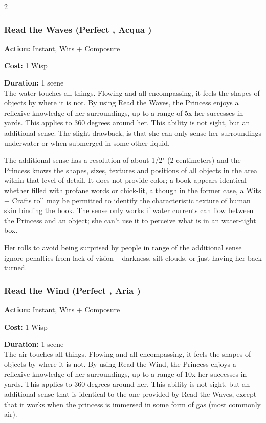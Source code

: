 \begin{multicols}{2}
\subsubsection*{Read the Waves (Perfect \textbullet, Acqua \textbullet)}

\noindent \textbf{Action:} Instant, Wits + Composure

\noindent \textbf{Cost:} 1 Wisp

\noindent \textbf{Duration:} 1 scene \\

\noindent The water touches all things. Flowing and all-encompassing, it feels the shapes of objects by where it is not. By using Read the Waves, the Princess enjoys a reflexive knowledge of her surroundings, up to a range of 5x her successes in yards. This applies to 360 degrees around her. This ability is not sight, but an additional sense. The slight drawback, is that she can only sense her surroundings underwater or when submerged in some other liquid. 

The additional sense has a resolution of about 1/2" (2 centimeters) and the Princess knows the shapes, sizes, textures and positions of all objects in the area within that level of detail. It does not provide color; a book appears identical whether filled with profane words or chick-lit, although in the former case, a Wits + Crafts roll may be permitted to identify the characteristic texture of human skin binding the book. The sense only works if water currents can flow between the Princess and an object; she can't use it to perceive what is in an water-tight box. 

Her rolls to avoid being surprised by people in range of the additional sense ignore penalties from lack of vision -- darkness, silt clouds, or just having her back turned.

\subsubsection*{Read the Wind (Perfect \textbullet, Aria \textbullet)}

\noindent \textbf{Action:} Instant, Wits + Composure

\noindent \textbf{Cost:} 1 Wisp

\noindent \textbf{Duration:} 1 scene \\

\noindent The air touches all things. Flowing and all-encompassing, it feels the shapes of objects by where it is not. By using Read the Wind, the Princess enjoys a reflexive knowledge of her surroundings, up to a range of 10x her successes in yards. This applies to 360 degrees around her. This ability is not sight, but an additional sense that is identical to the one provided by Read the Waves, except that it works when the princess is immersed in some form of gas (most commonly air). 


\end{multicols}

